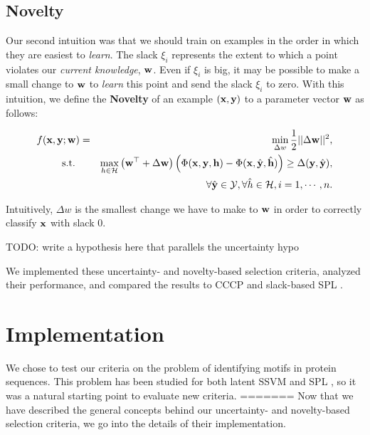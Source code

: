 \documentclass{article}
\newcommand{\mysection}[1]{\vspace{-4mm}\section{#1}\vspace{-4mm}}
\begin{document}
\subsection{Novelty}
Our second intuition was that we should train on examples in the order in which they are easiest to \emph{learn}.  The slack $\xi_i$ represents the extent to which a point violates our \emph{current knowledge}, $\bf w$.  Even if $\xi_i$ is big, it may be possible to make a small change to $\bf w$ to \emph{learn} this point and send the slack $\xi_i$ to zero.  With this intuition, we define the \textbf{Novelty} of an example $(\bf x, \bf y)$ to a parameter vector $\bf w$ as follows:

\begin{eqnarray}
f(\bf x, \bf y; \bf w) &=&\min_{\Delta w} \frac{1}{2}||{\Delta\bf w}||^2, \nonumber \\
\mbox{s.t. } && \max_{h \in {\cal H}} \left( {\bf w}^\top + \Delta\bf w \right) \left(\Phi({\bf x},{\bf y},{\bf h}) - 
		\Phi({\bf x},\hat{\bf y},\hat{\bf h}) \right)
	 \geq \Delta({\bf y},\hat{\bf y}) , \nonumber \\
\label{eq:novelty}
&&\forall \hat{\bf y} \in {\cal Y}, \forall \hat{h} \in {\cal H}, i=1,\cdots,n.
\end{eqnarray}

Intuitively, $\Delta w$ is the smallest change we have to make to $\bf w$ in order to correctly classify $\bf x$ with slack 0.  

TODO: write a hypothesis here that parallels the uncertainty hypo

We implemented these uncertainty- and novelty-based selection criteria, analyzed their performance, and compared the results to CCCP \cite{SSVM} and slack-based SPL \cite{SPL}.

\mysection{Implementation}
\label{sec:implementation}
We chose to test our criteria on the problem of identifying motifs in protein sequences.  This problem has been studied for both latent SSVM \cite{SSVM} and SPL \cite{SPL}, so it was a natural starting point to evaluate new criteria.
=======
Now that we have described the general concepts behind our uncertainty- and novelty-based selection criteria, we go into the details of their implementation.


\end{document}
